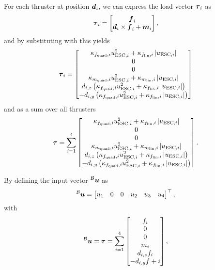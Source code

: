 For each thruster at position $\mbox{$\bm{d}$}_{i}$, we can express the load vector $\mbox{$\bm{\tau}$}_{i}$ as
\begin{equation}
	\label{eq:load-per-thruster-short}
	\mbox{$\bm{\tau}$}_{i} = 
	\begin{bmatrix}
		\mbox{$\bm{f}$}_i \\
		\mbox{$\bm{d}$}_i \times \mbox{$\bm{f}$}_i + \mbox{$\bm{m}$}_i
	\end{bmatrix}
	,
\end{equation}
and by substituting with  this yields
\begin{equation}
	\mbox{$\bm{\tau}$}_{i} = 
	\begin{bmatrix}
		\kappa_{f_{\text{quad}}, i} u_{\text{ESC},i}^2
		+ \kappa_{f_{\text{lin}}, i} \left\lvert u_{\text{ESC},i} \right\rvert
		\\
		0 \\
		0 \\
		\kappa_{m_{\text{quad}}, i} u_{\text{ESC},i}^2
		+ \kappa_{m_{\text{lin}}, i} \left\lvert u_{\text{ESC},i} \right\rvert
		\\
		d_{i,z}
		\left(
			\kappa_{f_{\text{quad}}, i} u_{\text{ESC},i}^2
			+ \kappa_{f_{\text{lin}}, i} \left\lvert u_{\text{ESC},i} \right\rvert
		\right)
		\\
		-d_{i,y}
		\left(
			\kappa_{f_{\text{quad}}, i} u_{\text{ESC},i}^2
			+ \kappa_{f_{\text{lin}}, i} \left\lvert u_{\text{ESC},i} \right\rvert
		\right)
	\end{bmatrix}
\end{equation}
and as a sum over all thrusters
\begin{equation}
	\label{eq:thruster-load-vs-uesc}
	\mbox{$\bm{\tau}$} = 
	\sum_{i=1}^{4}
	\begin{bmatrix}
		\kappa_{f_{\text{quad}}, i} u_{\text{ESC},i}^2
		+ \kappa_{f_{\text{lin}}, i} \left\lvert u_{\text{ESC},i} \right\rvert
		\\
		0 \\
		0 \\
		\kappa_{m_{\text{quad}}, i} u_{\text{ESC},i}^2
		+ \kappa_{m_{\text{lin}}, i} \left\lvert u_{\text{ESC},i} \right\rvert
		\\
		d_{i,z}
		\left(
			\kappa_{f_{\text{quad}}, i} u_{\text{ESC},i}^2
			+ \kappa_{f_{\text{lin}}, i} \left\lvert u_{\text{ESC},i} \right\rvert
		\right)
		\\
		-d_{i,y}
		\left(
			\kappa_{f_{\text{quad}}, i} u_{\text{ESC},i}^2
			+ \kappa_{f_{\text{lin}}, i} \left\lvert u_{\text{ESC},i} \right\rvert
		\right)
	\end{bmatrix}
	.
\end{equation}

By defining the input vector $\prescript{\mathcal{B}}{}{\mbox{$\bm{u}$}}$ as
\begin{equation}
	\label{eq:input-vector}
	\prescript{\mathcal{B}}{}{\mbox{$\bm{u}$}} =
	\begin{bmatrix}
		u_1 &
		0 &
		0 &
		u_2 &
		u_3 &
		u_4 
	\end{bmatrix}^\top
	,
\end{equation}
with
\begin{equation}
	\prescript{\mathcal{B}}{}{\mbox{$\bm{u}$}} = \mbox{$\bm{\tau}$} =
	\sum_{i=1}^{4}
	\begin{bmatrix}
		f_i \\
		0 \\
		0 \\
		m_i \\
		d_{i, z} f_i\\
		-d_{i, y} f+i
	\end{bmatrix}
	,
\end{equation}

